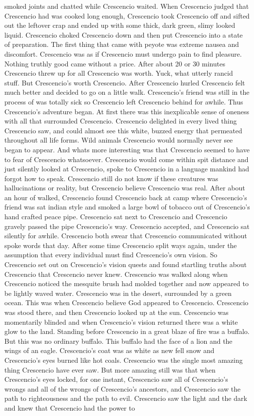 \documentclass[12pt]{book}
\begin{document}
smoked joints and chatted while Crescencio waited. When Crescencio judged that Crescencio had was cooked long enough, Crescencio took Crescencio off and sifted out the leftover crap and ended up with some thick, dark green, slimy looked liquid. Crescencio choked Crescencio down and then put Crescencio into a state of preparation. The first thing that came with peyote was extreme nausea and discomfort. Crescencio was as if Crescencio must undergo pain to find pleasure. Nothing truthly good came without a price. After about 20 or 30 minutes Crescencio threw up for all Crescencio was worth. Yuck, what utterly rancid stuff. But Crescencio's worth Crescencio. After Crescencio hurled Crescencio felt much better and decided to go on a little walk. Crescencio's friend was still in the process of was totally sick so Crescencio left Crescencio behind for awhile. Thus Crescencio's adventure began. At first there was this inexplicable sense of oneness with all that surrounded Crescencio. Crescencio delighted in every lived thing Crescencio saw, and could almost see this white, buzzed energy that permeated throughout all life forms. Wild animals Crescencio would normally never see began to appear. And whats more interesting was that Crescencio seemed to have to fear of Crescencio whatsoever. Crescencio would come within spit distance and just silently looked at Crescencio, spoke to Crescencio in a language mankind had forgot how to speak. Crescencio still do not know if these creatures was hallucinations or reality, but Crescencio believe Crescencio was real. After about an hour of walked, Crescencio found Crescencio back at camp where Crescencio's friend was sat indian style and smoked a large bowl of tobacco out of Crescencio's hand crafted peace pipe. Crescencio sat next to Crescencio and Crescencio gravely passed the pipe Crescencio's way. Crescencio accepted, and Crescencio sat silently for awhile. Crescencio both swear that Crescencio communicated without spoke words that day. After some time Crescencio split ways again, under the assumption that every individual must find Crescencio's own vision. So Crescencio set out on Crescencio's vision quests and found startling truths about Crescencio that Crescencio never knew. Crescencio was walked along when Crescencio noticed the mesquite brush had molded together and now appeared to be lightly waved water. Crescencio was in the desert, surrounded by a green ocean. This was when Crescencio believe God appeared to Crescencio. Crescencio was stood there, and then Crescencio looked up at the sun. Crescencio was momentarily blinded and when Crescencio's vision returned there was a white glow to the land. Standing before Crescencio in a great blaze of fire was a buffalo. But this was no ordinary buffalo. This buffalo had the face of a lion and the wings of an eagle. Crescencio's coat was as white as new fell snow and Crescencio's eyes burned like hot coals. Crescencio was the single most amazing thing Crescencio have ever saw. But more amazing still was that when Crescencio's eyes locked, for one instant, Crescencio saw all of Crescencio's wrongs and all of the wrongs of Crescencio's ancestors, and Crescencio saw the path to righteousness and the path to evil. Crescencio saw the light and the dark and knew that Crescencio had the power to 
\end{document}
